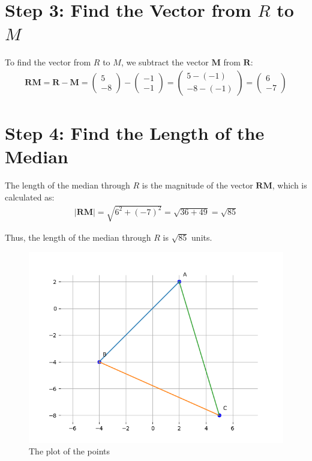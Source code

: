 \documentclass[journal]{IEEEtran}
\numberwithin{equation}{enumi}
\numberwithin{figure}{enumi}
\begin{document}
\section*{Step 3: Find the Vector from \( R \) to \( M \)}

To find the vector from \( R \) to \( M \), we subtract the vector \( \mathbf{M} \) from \( \mathbf{R} \):
\begin{align}
\mathbf{RM} = \mathbf{R} - \mathbf{M} = \begin{pmatrix} 5 \\ -8 \end{pmatrix} - \begin{pmatrix} -1 \\ -1 \end{pmatrix} = \begin{pmatrix} 5 - (-1) \\ -8 - (-1) \end{pmatrix} = \begin{pmatrix} 6 \\ -7 \end{pmatrix}
\end{align}

\section*{Step 4: Find the Length of the Median}

The length of the median through \( R \) is the magnitude of the vector \( \mathbf{RM} \), which is calculated as:
\begin{align}
|\mathbf{RM}| = \sqrt{6^2 + (-7)^2} = \sqrt{36 + 49} = \sqrt{85}
\end{align}

Thus, the length of the median through \( R \) is \( \sqrt{85} \) units.


\begin{figure}[h!]
  \hspace{-1cm}
  \includegraphics[width=1.2\textwidth]{Figure_2.png}
  
  \caption{The plot of the points }
  \label{fig:your_label}
\end{figure}
\end{document}
